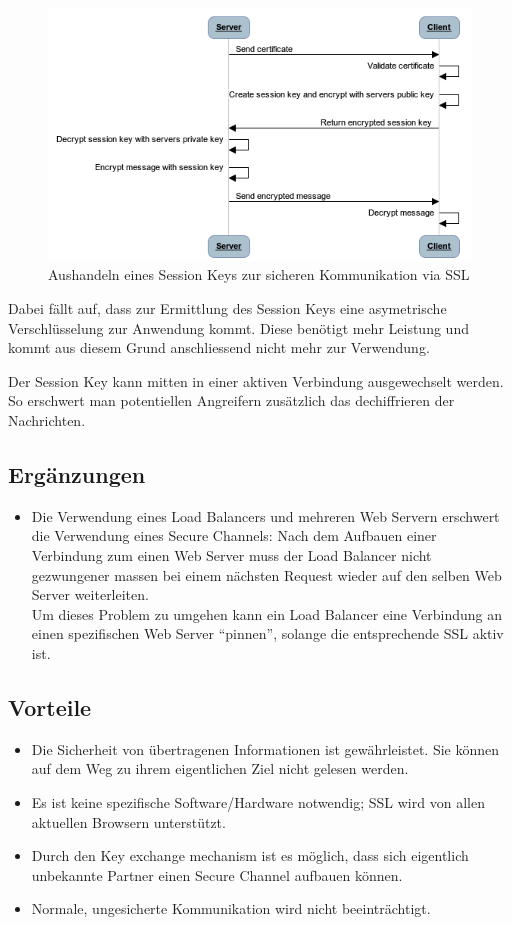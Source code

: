 \begin{figure}[H]
	\centering
	\includegraphics[width=12cm]{content/secure-internet-applications/images/secure-channels-key-exchange.png}
	\caption{Aushandeln eines Session Keys zur sicheren Kommunikation via SSL}
\end{figure}

Dabei fällt auf, dass zur Ermittlung des Session Keys eine asymetrische Verschlüsselung zur Anwendung kommt. Diese benötigt mehr Leistung und kommt aus diesem Grund anschliessend nicht mehr zur Verwendung.

Der Session Key kann mitten in einer aktiven Verbindung ausgewechselt werden. So erschwert man potentiellen Angreifern zusätzlich das dechiffrieren der Nachrichten.


\subsection*{Ergänzungen}
\begin{itemize}
	\item Die Verwendung eines Load Balancers und mehreren Web Servern erschwert die Verwendung eines Secure Channels: Nach dem Aufbauen einer Verbindung zum einen Web Server muss der Load Balancer nicht gezwungener massen bei einem nächsten Request wieder auf den selben Web Server weiterleiten.\\Um dieses Problem zu umgehen kann ein Load Balancer eine Verbindung an einen spezifischen Web Server ``pinnen'', solange die entsprechende SSL aktiv ist.
\end{itemize}

\subsection*{Vorteile}
\begin{itemize}
	\item Die Sicherheit von übertragenen Informationen ist gewährleistet. Sie können auf dem Weg zu ihrem eigentlichen Ziel nicht gelesen werden.
	\item Es ist keine spezifische Software/Hardware notwendig; SSL wird von allen aktuellen Browsern unterstützt.
	\item Durch den Key exchange mechanism ist es möglich, dass sich eigentlich unbekannte Partner einen Secure Channel aufbauen können.
	\item Normale, ungesicherte Kommunikation wird nicht beeinträchtigt.
\end{itemize}

